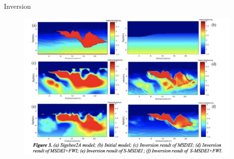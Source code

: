 \documentclass[xcolor=dvipsnames,notes]{beamer}
\begin{document}
\begin{frame}{Inversion}
\begin{figure}
  \includegraphics[width=\textwidth]{Fig/fwi.png}
\end{figure}
\end{frame}
\end{document}
